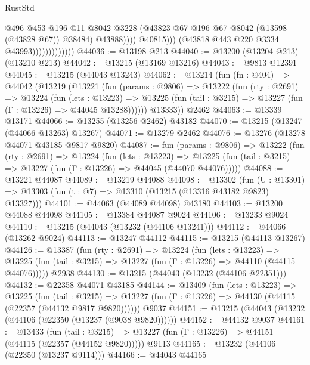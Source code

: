 \begin{lexlean}{RustStd}
\begin{coremodule}
                                          @496
                                          @453
                                          @196
                                          @11
                                          @8042
                                          @3228
                                          (@43823 @67 @196 @67 @8042 (@13598 (@43828 @67)) @38484)
                                          @43888))))
                                  @40815)))
                            (@43818 @443 @220 @3334 @43993)))))))))))))
@44036 := @13198 @213
@44040 := @13200 (@13204 @213) (@13210 @213)
@44042 := @13215 (@13169 @13216)
@44043 := @9813 @12391
@44045 := @13215 (@44043 @13243)
@44062 := @13214
    (fun (fn : @404) =>
    @44042
      (@13219
        (@13221
          (fun (params : @9806) =>
          @13222
            (fun (rty : @2691) =>
            @13224
              (fun (lets : @13223) =>
              @13225 (fun (tail : @3215) => @13227 (fun (Γ : @13226) => @44045 @13288))))))
        @13333))
    @2462
@44063 := @13339 @13171
@44066 := @13255 (@13256 @2462) @43182
@44070 := @13215 (@13247 (@44066 @13263) @13267)
@44071 := @13279 @2462
@44076 := @13276 (@13278 @44071 @43185 @9817 @9820)
@44087 := fun (params : @9806) =>
  @13222
    (fun (rty : @2691) =>
    @13224
      (fun (lets : @13223) =>
      @13225 (fun (tail : @3215) => @13227 (fun (Γ : @13226) => @44045 (@44070 @44076)))))
@44088 := @13221 @44087
@44089 := @13219 @44088
@44098 := @13302
    (fun (U : @13301) => @13303 (fun (t : @7) => @13310 (@13215 (@13316 @43182 @9823) @13327)))
@44101 := @44063 (@44089 @44098) @43180
@44103 := @13200 @44088 @44098
@44105 := @13384 @44087 @9024
@44106 := @13233 @9024
@44110 := @13215 (@44043 (@13232 (@44106 @13241)))
@44112 := @44066 (@13262 @9024)
@44113 := @13247 @44112
@44115 := @13215 (@44113 @13267)
@44126 := @13387
    (fun (rty : @2691) =>
    @13224
      (fun (lets : @13223) =>
      @13225 (fun (tail : @3215) => @13227 (fun (Γ : @13226) => @44110 (@44115 @44076)))))
    @2938
@44130 := @13215 (@44043 (@13232 (@44106 @22351)))
@44132 := @22358 @44071 @43185
@44144 := @13409
    (fun (lets : @13223) =>
    @13225
      (fun (tail : @3215) =>
      @13227 (fun (Γ : @13226) => @44130 (@44115 (@22357 (@44132 @9817 @9820))))))
    @9037
@44151 := @13215 (@44043 (@13232 (@44106 (@22350 (@13237 (@9038 @9820))))))
@44152 := @44132 @9037
@44161 := @13433
    (fun (tail : @3215) => @13227 (fun (Γ : @13226) => @44151 (@44115 (@22357 (@44152 @9820)))))
    @9113
@44165 := @13232 (@44106 (@22350 (@13237 @9114)))
@44166 := @44043 @44165

\end{coremodule}
\end{lexlean}

